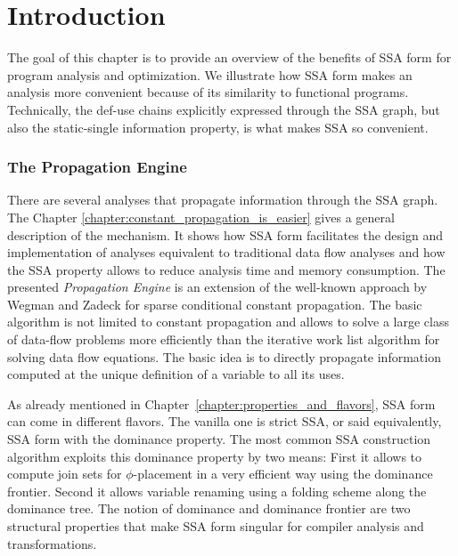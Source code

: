 \chapter{Introduction
  }
\label{chapter:analysis}

The goal of this chapter is to provide an overview of the benefits of
SSA form for program analysis and optimization. We illustrate how SSA
form makes an analysis more convenient because of its similarity to
functional programs. Technically, the def-use chains explicitly
expressed through the SSA graph, but also the static-single
information property, is what makes SSA so convenient.

\ifconstantprop

\subsection{The Propagation Engine}

There are several analyses that propagate information through the SSA
graph.  The Chapter \ref{chapter:constant_propagation_is_easier} gives a
general description of the mechanism. It shows how SSA form
facilitates the design and implementation of analyses equivalent to
traditional data flow analyses and how the SSA property allows to
reduce analysis time and memory consumption.  The presented {\em
  Propagation Engine} is an extension of the well-known approach by
Wegman and Zadeck for sparse conditional constant propagation. The
basic algorithm is not limited to constant propagation and allows to
solve a large class of data-flow problems more efficiently than the
iterative work list algorithm for solving data flow equations. The
basic idea is to directly propagate information computed at the unique
definition of a variable to all its uses.

\fi

As already mentioned in Chapter~\ref{chapter:properties_and_flavors},
SSA form can come in different flavors. The vanilla one is strict SSA, or said
equivalently, SSA form with the dominance property. The most common SSA
construction algorithm exploits this dominance property by two means:
First it allows to compute join sets for $\phi$-placement in a very
efficient way using the dominance frontier.  Second it allows variable
renaming using a folding scheme along the dominance tree.  The notion
of dominance and dominance frontier are two structural properties that
make SSA form singular for compiler analysis and transformations.

